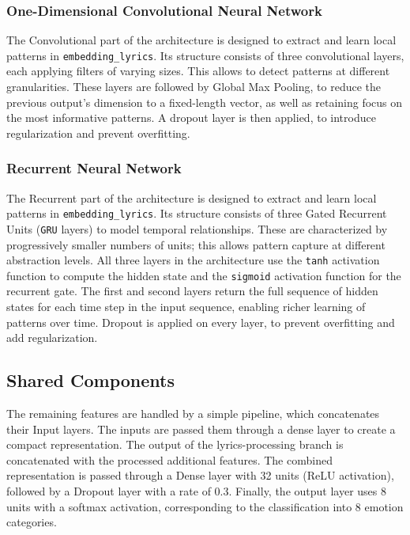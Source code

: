 \subsubsection*{One-Dimensional Convolutional Neural Network}
The Convolutional part of the architecture is designed to extract and learn
local patterns in \texttt{embedding\_lyrics}.
Its structure consists of three convolutional layers, each applying filters of
varying sizes. This allows to detect patterns at different granularities.
These layers are followed by Global Max Pooling, to reduce the previous output's
dimension to a fixed-length vector, as well as retaining focus on the most
informative patterns.
A dropout layer is then applied, to introduce regularization and prevent
overfitting.


\subsubsection*{Recurrent Neural Network}
The Recurrent part of the architecture is designed to extract and learn
local patterns in \texttt{embedding\_lyrics}.
Its structure consists of three Gated Recurrent Units (\texttt{GRU} layers)
to model temporal relationships. These are characterized by progressively smaller
numbers of units; this allows pattern capture at different abstraction levels.
All three layers in the architecture use the \texttt{tanh} activation function
to compute the hidden state and
the \texttt{sigmoid} activation function for the recurrent gate.
The first and second layers return the full sequence of hidden states for each
time step in the input sequence, enabling richer learning of patterns over time.
Dropout is applied on every layer, to prevent overfitting and add regularization.


\subsection*{Shared Components}
The remaining features are handled by a simple pipeline, which concatenates
their Input layers.
The inputs are passed them through a dense layer to create a compact
representation.
The output of the lyrics-processing branch is concatenated with the processed
additional features.
The combined representation is passed through a Dense layer with 32 units
(ReLU activation), followed by a Dropout layer with a rate of 0.3.
Finally, the output layer uses 8 units with a softmax activation, corresponding
to the classification into 8 emotion categories.\\


